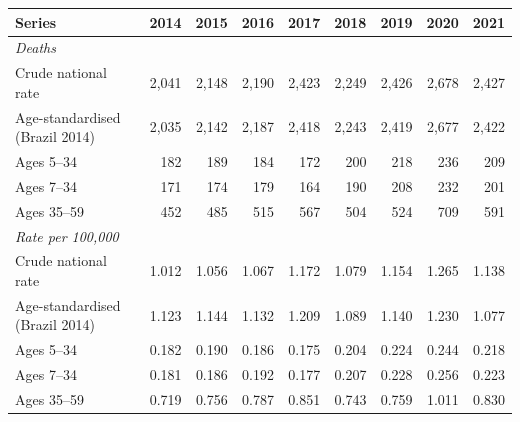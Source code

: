 \begin{tabular}{lrrrrrrrr}
\toprule
Series & 2014 & 2015 & 2016 & 2017 & 2018 & 2019 & 2020 & 2021 \\
\midrule
\multicolumn{9}{l}{\emph{Deaths}} \\
Crude national rate & 2,041 & 2,148 & 2,190 & 2,423 & 2,249 & 2,426 & 2,678 & 2,427 \\
Age-standardised (Brazil 2014) & 2,035 & 2,142 & 2,187 & 2,418 & 2,243 & 2,419 & 2,677 & 2,422 \\
Ages 5--34 & 182 & 189 & 184 & 172 & 200 & 218 & 236 & 209 \\
Ages 7--34 & 171 & 174 & 179 & 164 & 190 & 208 & 232 & 201 \\
Ages 35--59 & 452 & 485 & 515 & 567 & 504 & 524 & 709 & 591 \\
\midrule
\multicolumn{9}{l}{\emph{Rate per 100,000}} \\
Crude national rate & 1.012 & 1.056 & 1.067 & 1.172 & 1.079 & 1.154 & 1.265 & 1.138 \\
Age-standardised (Brazil 2014) & 1.123 & 1.144 & 1.132 & 1.209 & 1.089 & 1.140 & 1.230 & 1.077 \\
Ages 5--34 & 0.182 & 0.190 & 0.186 & 0.175 & 0.204 & 0.224 & 0.244 & 0.218 \\
Ages 7--34 & 0.181 & 0.186 & 0.192 & 0.177 & 0.207 & 0.228 & 0.256 & 0.223 \\
Ages 35--59 & 0.719 & 0.756 & 0.787 & 0.851 & 0.743 & 0.759 & 1.011 & 0.830 \\
\bottomrule
\end{tabular}
